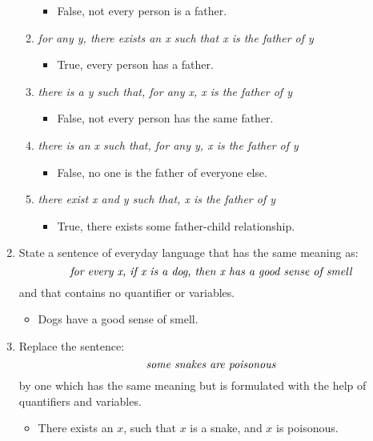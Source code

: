 \begin{enumerate}
\begin{enumerate}
\begin{itemize}
    \item False, not every person is a father.
    \end{itemize}
  \item \emph{for any y, there exists an x such that x is the father
      of y}
    \begin{itemize}
    \item True, every person has a father.
    \end{itemize}
  \item \emph{there is a y such that, for any x, x is the father of y}
    \begin{itemize}
    \item False, not every person has the same father.
    \end{itemize}
  \item \emph{there is an x such that, for any y, x is the father of
      y}
    \begin{itemize}
    \item False, no one is the father of everyone else.
    \end{itemize}
  \item \emph{there exist x and y such that, x is the father of y}
    \begin{itemize}
    \item True, there exists some father-child relationship.
    \end{itemize}
  \end{enumerate}

\item State a sentence of everyday language that has the same meaning
  as:
  \begin{equation*}
    \emph{for every x, if x is a dog, then x has a good sense of smell}
  \end{equation*}
  and that contains no quantifier or variables.

  \begin{itemize}
  \item Dogs have a good sense of smell.
  \end{itemize}

\item Replace the sentence:
  \begin{equation*}
    \emph{some snakes are poisonous}
  \end{equation*}
  by one which has the same meaning but is formulated with the help of
  quantifiers and variables.

  \begin{itemize}
  \item There exists an $x$, such that $x$ is a snake, and $x$ is
    poisonous.
  \end{itemize}


\end{enumerate}
